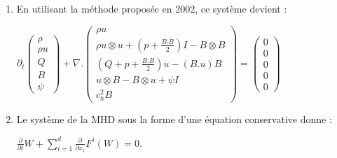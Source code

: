 \documentclass[a4paper,10pt]{article}
\begin{document}
\begin{enumerate}
    \item
     En utilisant la m\'ethode propos\'ee en 2002, ce syst\`eme devient : \\
     \begin{center}
       \begin{math}
         \partial_t
         \left( \begin{array}{c}
         \rho \\
         \rho u \\
         Q \\
         B \\
         \psi
         \end{array}
       \right)
       + \nabla .
       \left( \begin{array}{c}
         \rho u \\
         \rho u \otimes u + (p + \frac{B.B}{2})I - B \otimes B \\
         (Q + p + \frac{B.B}{2})u - (B.u)B \\
         u \otimes B - B \otimes u + \psi I\\
         c^2_h B
         \end{array}
       \right)
       = \left( \begin{array}{c}
         0 \\
         0 \\
         0 \\
         0 \\
         0
         \end{array}
        \right)
      \end{math}
     \end{center}

    \item
    Le syst\`eme de la MHD sous la forme d'une \'equation conservative donne : \\
    \begin{center}
      \begin{math}
        \frac{\partial}{\partial t}W + \sum\limits_{i=1}^d \frac{\partial}{\partial x_i}F^i(W) = 0.
      \end{math}
    \end{center}


\end{enumerate}
\end{document}
